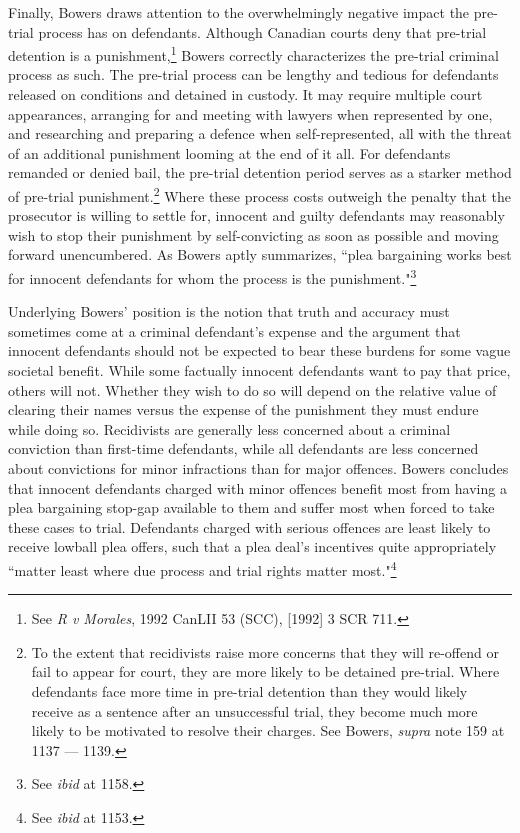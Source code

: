 Finally, Bowers draws attention to the overwhelmingly negative impact the pre-trial process has on defendants. Although Canadian courts deny that pre-trial detention is a punishment,\footnote{See \textit{R v Morales}, 1992 CanLII 53 (SCC), [1992] 3 SCR 711.} Bowers correctly characterizes the pre-trial criminal process as such. The pre-trial process can be lengthy and tedious for defendants released on conditions and detained in custody. It may require multiple court appearances, arranging for and meeting with lawyers when represented by one, and researching and preparing a defence when self-represented, all with the threat of an additional punishment looming at the end of it all. For defendants remanded or denied bail, the pre-trial detention period serves as a starker method of pre-trial punishment.\footnote{To the extent that recidivists raise more concerns that they will re-offend or fail to appear for court, they are more likely to be detained pre-trial. Where defendants face more time in pre-trial detention than they would likely receive as a sentence after an unsuccessful trial, they become much more likely to be motivated to resolve their charges. See Bowers, \textit{supra} note 159 at 1137 — 1139.} Where these process costs outweigh the penalty that the prosecutor is willing to settle for, innocent and guilty defendants may reasonably wish to stop their punishment by self-convicting as soon as possible and moving forward unencumbered. As Bowers aptly summarizes, ``plea bargaining works best for innocent defendants for whom the process is the punishment."\footnote{See \textit{ibid} at 1158.}

Underlying Bowers' position is the notion that truth and accuracy must sometimes come at a criminal defendant's expense and the argument that innocent defendants should not be expected to bear these burdens for some vague societal benefit. While some factually innocent defendants want to pay that price, others will not. Whether they wish to do so will depend on the relative value of clearing their names versus the expense of the punishment they must endure while doing so. Recidivists are generally less concerned about a criminal conviction than first-time defendants, while all defendants are less concerned about convictions for minor infractions than for major offences. Bowers concludes that innocent defendants charged with minor offences benefit most from having a plea bargaining stop-gap available to them and suffer most when forced to take these cases to trial. Defendants charged with serious offences are least likely to receive lowball plea offers, such that a plea deal's incentives quite appropriately ``matter least where due process and trial rights matter most."\footnote{See \textit{ibid} at 1153.} 


